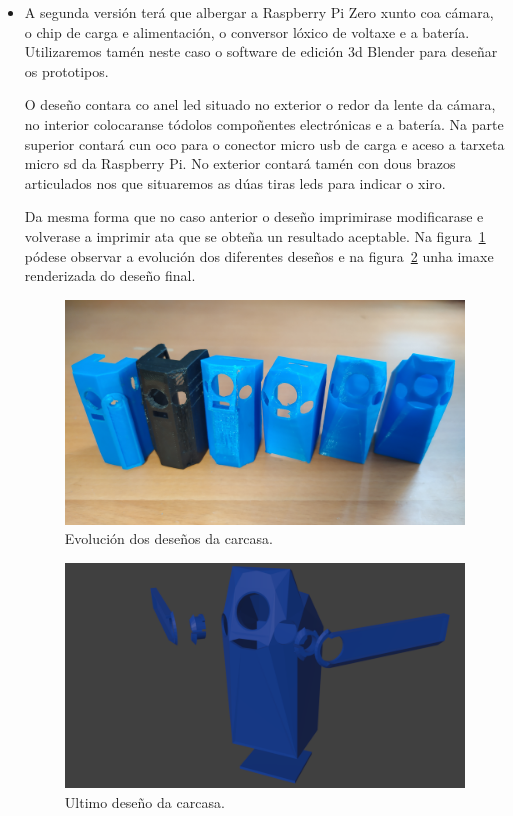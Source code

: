 \begin{itemize}
    \item A segunda versión terá que albergar a Raspberry Pi Zero xunto coa cámara, o chip de carga e alimentación, o conversor lóxico de voltaxe e a batería. Utilizaremos tamén neste caso o software de edición 3d Blender para deseñar os prototipos.

    O deseño contara co anel led situado no exterior o redor da lente da cámara, no interior colocaranse tódolos compoñentes electrónicas e a batería. Na parte superior contará cun oco para o conector micro usb de carga e aceso a tarxeta micro sd da Raspberry Pi. No exterior contará tamén con dous brazos articulados nos que situaremos as dúas tiras leds para indicar o xiro.

    Da mesma forma que no caso anterior o deseño imprimirase modificarase e volverase a imprimir ata que se obteña un resultado aceptable. Na figura~\ref{fig:evolucion_carcasa} pódese observar a evolución dos diferentes deseños e na figura~\ref{fig:carcasa} unha imaxe renderizada do deseño final.


    \begin{figure}[tb]
      \centering
      \includegraphics[scale=.1]{imaxes/evolucion-carcasa.jpg}
      \caption{Evolución dos deseños da carcasa.}
      \label{fig:evolucion_carcasa}
    \end{figure}

    \begin{figure}[tb]
      \centering
      \includegraphics[scale=.4]{imaxes/carcasa.png}
      \caption{Ultimo deseño da carcasa.}
      \label{fig:carcasa}
    \end{figure}
\end{itemize}
